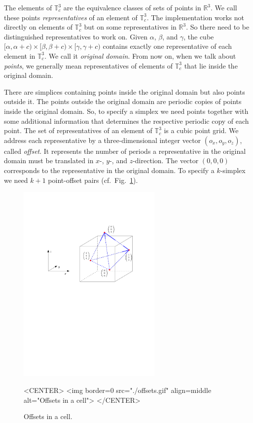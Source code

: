 The elements of $\mathbb T_c^3$ are the equivalence classes of sets of
points in $\mathbb R^3$. We call these points \textit{representatives}
of an element of $\mathbb 
T_c^3$. The implementation works not directly on elements of $\mathbb
T_c^3$ but on some representatives in $\mathbb R^3$. So there need to
be distinguished representatives to work on. Given $\alpha$, $\beta$,
and $\gamma$, the cube
$[\alpha,\alpha+c)\times[\beta,\beta+c)\times[\gamma,\gamma+c)$ 
contains exactly one representative of each element in $\mathbb
T_c^3$. We call it \emph{original domain}. From now on, when we talk
about \textit{points}, we generally mean representatives of elements
of $\mathbb T_c^3$ that lie inside the original domain.

There are simplices containing points inside the original domain but
also points outside it. The points outside the original domain are
periodic copies of points inside the original domain. So, to
specify a simplex we need points together with some additional
information that determines the respective periodic copy of each point. 
The set of representatives of an element of $\mathbb T_c^3$ is a cubic
point grid. We address each representative by a three-dimensional
integer vector $(o_x,o_y,o_z)$, called \emph{offset}. It
represents the number of periods a representative in the original
domain must be translated in $x$-, $y$-, and $z$-direction.
The vector $(0,0,0)$ corresponds to the representative in the original
domain. To specify a $k$-simplex we need $k+1$ point-offset pairs
(cf.\ Fig.~\ref{P3Triangulation3-fig-offsets}). 

\begin{figure}[htbp]
\begin{ccTexOnly}
\begin{center} 
\includegraphics[width=7cm]{Periodic_3_triangulation_3/offsets} 
\end{center}
\end{ccTexOnly}
\begin{ccHtmlOnly}
<CENTER>
<img border=0 src="./offsets.gif" align=middle alt="Offsets in a cell">
</CENTER>
\end{ccHtmlOnly}
\caption{Offsets in a cell.
\label{P3Triangulation3-fig-offsets}}
\end{figure} 

